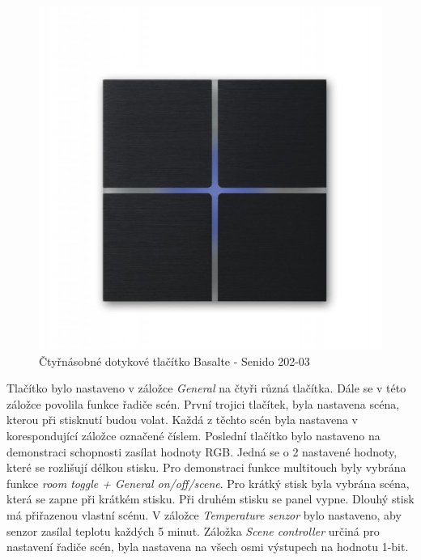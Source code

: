 \begin{figure}[!ht]
  \begin{center}
    \includegraphics[scale=0.4]{obrazky/Basalte.jpg}
  \end{center}
  \caption[Čtyřnásobné dotykové tlačítko Basalte - Senido 202-03 \cite{Basalte}]{Čtyřnásobné dotykové tlačítko Basalte - Senido 202-03 \cite{Basalte}}
  \label{fig:Čtyřnásobné dotykové tlačítko Basalte - Senido 202-03}
\end{figure}

\newpage Tlačítko bylo nastaveno v záložce \textit{General} na čtyři různá tlačítka. Dále se v této záložce povolila funkce řadiče scén. První trojici tlačítek, byla nastavena scéna, kterou při stisknutí budou volat.  Každá z těchto scén byla nastavena v korespondující záložce označené číslem. Poslední tlačítko bylo nastaveno na demonstraci schopnosti zasílat hodnoty RGB. Jedná se o 2 nastavené hodnoty, které se rozlišují délkou stisku. Pro demonstraci funkce multitouch byly vybrána funkce \textit{room toggle + General on/off/scene}. Pro krátký stisk byla vybrána scéna, která se zapne při krátkém stisku. Při druhém stisku se panel vypne. Dlouhý stisk má přiřazenou vlastní scénu. V záložce \textit{Temperature senzor} bylo nastaveno, aby senzor zasílal teplotu každých 5 minut. Záložka \textit{Scene controller} určiná pro nastavení řadiče scén, byla nastavena na všech osmi výstupech na hodnotu 1-bit.

